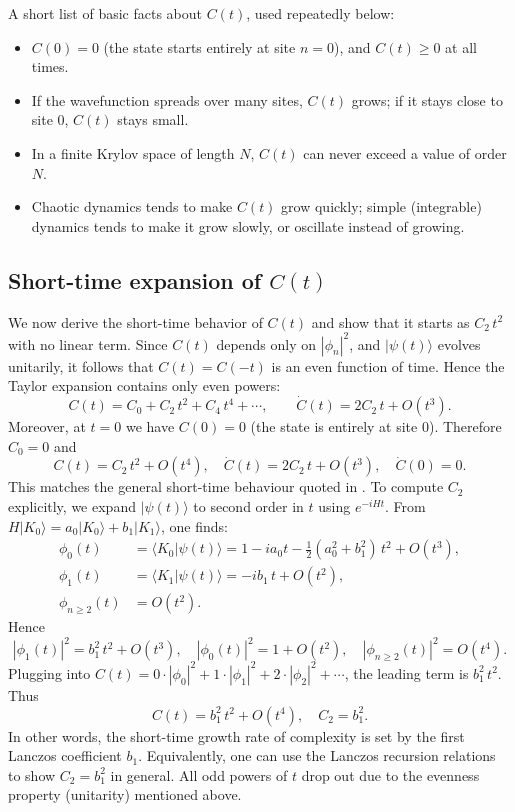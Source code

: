 \documentclass[11pt]{article}
\begin{document}
A short list of basic facts about $C(t)$, used repeatedly below:
\begin{itemize}
\item $C(0)=0$ (the state starts entirely at site $n=0$), and $C(t)\ge0$ at all times.
\item If the wavefunction spreads over many sites, $C(t)$ grows; if it stays close to site $0$, $C(t)$ stays small.
\item In a finite Krylov space of length $N$, $C(t)$ can never exceed a value of order $N$.
\item Chaotic dynamics tends to make $C(t)$ grow quickly; simple (integrable) dynamics tends to make it grow slowly, or oscillate instead of growing.
\end{itemize}

\subsection{Short-time expansion of $C(t)$}

We now derive the short-time behavior of $C(t)$ and show that it starts as $C_2\,t^2$ with no linear term.  Since $C(t)$ depends only on $|\phi_n|^2$, and $|\psi(t)\rangle$ evolves unitarily, it follows that $C(t)=C(-t)$ is an even function of time.  Hence the Taylor expansion contains only even powers:
\begin{equation*}
C(t)=C_0 + C_2\,t^2 + C_4\,t^4 + \cdots,\qquad
\dot C(t)=2C_2\,t+O(t^3).
\end{equation*}
Moreover, at $t=0$ we have $C(0)=0$ (the state is entirely at site 0).  Therefore $C_0=0$ and
\begin{equation}
C(t)=C_2\,t^2+O(t^4),
\quad
\dot C(t)=2C_2\,t + O(t^3),
\quad
\dot C(0)=0.
\label{eq:krylov-short-time}
\end{equation}
This matches the general short-time behaviour quoted in \cite{Parker:2018yvk,Balasubramanian:2022tpr}.  To compute $C_2$ explicitly, we expand $|\psi(t)\rangle$ to second order in $t$ using $e^{-iHt}$.  From $H|K_0\rangle = a_0|K_0\rangle + b_1|K_1\rangle$, one finds:
\begin{align*}
\phi_0(t) &= \langle K_0|\psi(t)\rangle 
= 1 - i a_0 t - \frac{1}{2}(a_0^2+b_1^2)\,t^2 + O(t^3),\\
\phi_1(t) &= \langle K_1|\psi(t)\rangle 
= -i b_1\,t + O(t^2),\\
\phi_{n\ge2}(t) &= O(t^2).
\end{align*}
Hence 
\begin{equation*}
|\phi_1(t)|^2 = b_1^2\,t^2 + O(t^3), 
\quad
|\phi_0(t)|^2 = 1 + O(t^2), 
\quad
|\phi_{n\ge2}(t)|^2=O(t^4).
\end{equation*}
Plugging into $C(t)=0\cdot|\phi_0|^2 + 1\cdot|\phi_1|^2 + 2\cdot|\phi_2|^2+\cdots$, the leading term is $b_1^2\,t^2$.  Thus
\begin{equation*}
C(t) = b_1^2\,t^2 + O(t^4),
\quad
C_2 = b_1^2.
\end{equation*}
In other words, the short-time growth rate of complexity is set by the first Lanczos coefficient $b_1$.  Equivalently, one can use the Lanczos recursion relations to show $C_2=b_1^2$ in general.  All odd powers of $t$ drop out due to the evenness property (unitarity) mentioned above.
\end{document}
